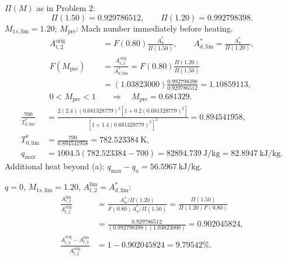$\Pi(M)$ as in Problem 2:
\[
\Pi(1.50)=0.929786512,\qquad \Pi(1.20)=0.992798398.
\]
$M_{1s,\mathrm{lim}}=1.20$; $M_{\mathrm{pre}}$: Mach number immediately before heating.
\begin{align*}
A_{t,2}^{\mathrm{orig}}
&=F(0.80)\frac{A_u^*}{\Pi(1.50)},\qquad
A_{d,\mathrm{lim}}^*=\frac{A_u^*}{\Pi(1.20)},\\
F(M_{\mathrm{pre}})
&=\frac{A_{t,2}^{\mathrm{orig}}}{A_{d,\mathrm{lim}}^*}
=F(0.80)\frac{\Pi(1.20)}{\Pi(1.50)}\\
&=(1.03823000)\frac{0.992798398}{0.929786512}=1.10859113,\\
0<M_{\mathrm{pre}}<1&\quad\Longrightarrow\quad
\boxed{M_{\mathrm{pre}}=0.681329}.
\end{align*}
\begin{align*}
\frac{700}{T_{0,\mathrm{lim}}^*}
&=\frac{2(2.4)(0.681328779)^2[1+0.2(0.681328779)^2]}
{[1+1.4(0.681328779)^2]^2}=0.894541958,\\
T_{0,\mathrm{lim}}^*&=\frac{700}{0.894541958}=782.523384~\mathrm K,\\
q_{\max}&=1004.5(782.523384-700)=82894.739~\mathrm{J/kg}
=\boxed{82.8947~\mathrm{kJ/kg}}.
\end{align*}
Additional heat beyond (a): $q_{\max}-q_a=56.5967~\mathrm{kJ/kg}$.

$q=0$, $M_{1s,\mathrm{lim}}=1.20$, $A_{t,2}^{\mathrm{lim}}=A_{d,\mathrm{lim}}^*$:
\begin{align*}
\frac{A_{t,2}^{\mathrm{lim}}}{A_{t,2}^{\mathrm{orig}}}
&=\frac{A_u^*/\Pi(1.20)}{F(0.80)A_u^*/\Pi(1.50)}
=\frac{\Pi(1.50)}{\Pi(1.20)F(0.80)}\\
&=\frac{0.929786512}{(0.992798398)(1.03823000)}=0.902045824,\\
\frac{A_{t,2}^{\mathrm{orig}}-A_{t,2}^{\mathrm{lim}}}
{A_{t,2}^{\mathrm{orig}}}
&=1-0.902045824=\boxed{9.79542\%}.
\end{align*}
